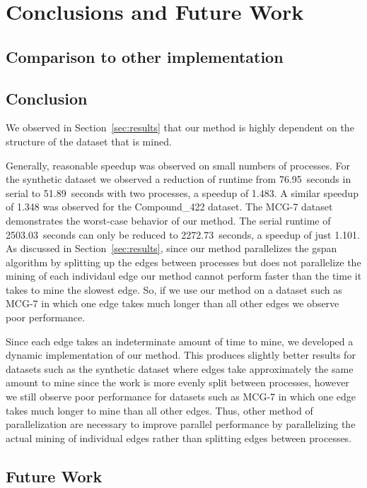 \section{Conclusions and Future Work}
\label{sec:conclusions}

\subsection{Comparison to other implementation}
\label{subsec:comparison}

\subsection{Conclusion}
\label{subsec:conclusions}

We observed in Section~\ref{sec:results} that our method is highly dependent
on the structure of the dataset that is mined.

Generally, reasonable speedup was observed on small numbers of processes. For
the synthetic dataset we observed a reduction of runtime from 76.95~seconds
in serial to 51.89~seconds with two processes, a speedup of 1.483. A similar
speedup of 1.348 was observed for the Compound\_422 dataset. The MCG-7 dataset
demonstrates the worst-case behavior of our method. The serial runtime of
2503.03~seconds can only be reduced to 2272.73~seconds, a speedup of just
1.101. As discussed in Section~\ref{sec:results}, since our method
parallelizes the gspan algorithm by splitting up the edges between processes
but does not parallelize the mining of each individaul edge our method cannot
perform faster than the time it takes to mine the slowest edge. So, if we
use our method on a dataset such as MCG-7 in which one edge takes much longer
than all other edges we observe poor performance.

Since each edge takes an indeterminate amount of time to mine, we developed
a dynamic implementation of our method. This produces slightly better results
for datasets such as the synthetic dataset where edges take approximately
the same amount to mine since the work is more evenly split between processes,
however we still observe poor performance for datasets such as MCG-7 in which
one edge takes much longer to mine than all other edges.
Thus, other method of parallelization are necessary to improve parallel
performance by parallelizing the actual mining of individual edges rather
than splitting edges between processes.

\subsection{Future Work}
\label{subsec:future}

